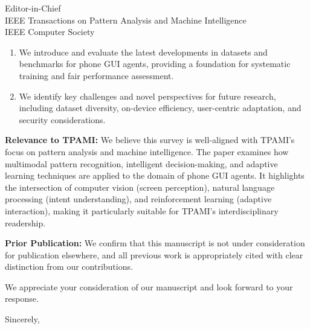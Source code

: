 \documentclass[11pt]{letter}
\begin{document}
\begin{letter}{Editor-in-Chief\\
IEEE Transactions on Pattern Analysis and Machine Intelligence\\
IEEE Computer Society}
\begin{enumerate}
    \item We introduce and evaluate the latest developments in datasets and benchmarks for phone GUI agents, providing a foundation for systematic training and fair performance assessment.
    
    \item We identify key challenges and novel perspectives for future research, including dataset diversity, on-device efficiency, user-centric adaptation, and security considerations.
\end{enumerate}

\textbf{Relevance to TPAMI:} We believe this survey is well-aligned with TPAMI's focus on pattern analysis and machine intelligence. The paper examines how multimodal pattern recognition, intelligent decision-making, and adaptive learning techniques are applied to the domain of phone GUI agents. It highlights the intersection of computer vision (screen perception), natural language processing (intent understanding), and reinforcement learning (adaptive interaction), making it particularly suitable for TPAMI's interdisciplinary readership.

\textbf{Prior Publication:} We confirm that this manuscript is not under consideration for publication elsewhere, and all previous work is appropriately cited with clear distinction from our contributions.

We appreciate your consideration of our manuscript and look forward to your response.

\closing{Sincerely,}

\end{letter}
\end{document}
